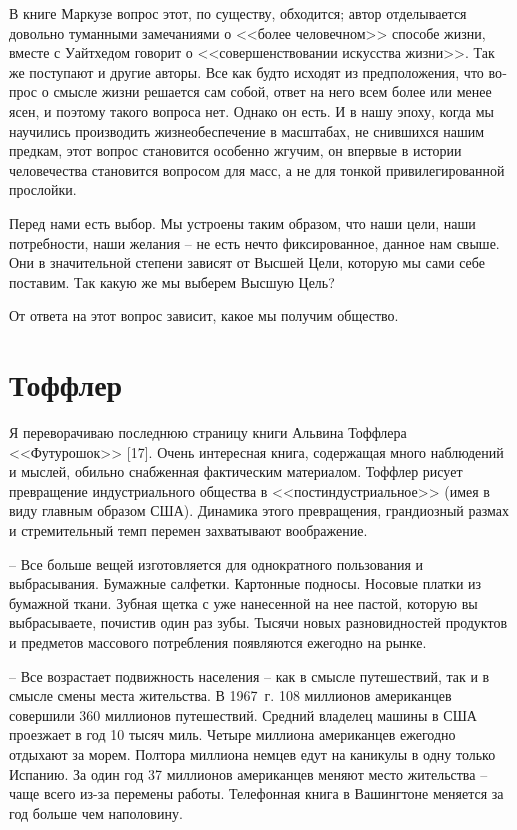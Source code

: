 \documentclass{book}
\begin{document}
В книге Маркузе вопрос этот, по существу, обходится; ав­тор отделывается довольно туманными замечаниями о <<более человечном>> способе жизни, вместе с Уайтхедом говорит о <<со­вершенствовании искусства жизни>>. Так же поступают и другие авторы. Все как будто исходят из предположения, что во­прос о смысле жизни решается сам собой, ответ на него всем более или менее ясен, и поэтому такого вопроса нет. Однако он есть. И в нашу эпоху, когда мы научились производить жизнеобеспечение в масштабах, не снившихся нашим предкам, этот вопрос становится особенно жгучим, он впервые в исто­рии человечества становится вопросом для масс,  а не для тонкой привилегированной прослойки.

Перед нами есть выбор. Мы устроены таким образом, что наши цели, наши потребности, наши желания -- не есть нечто фиксированное, данное нам свыше. Они в значительной степе­ни зависят от Высшей Цели, которую мы сами себе поставим. Так какую же мы выберем Высшую Цель?

От ответа на этот вопрос зависит, какое мы получим общество.


\section{Тоффлер}

Я переворачиваю последнюю страницу книги Альвина Тоффлера <<Футурошок>> [17]. Очень интересная книга, содержащая много наблюдений и мыслей, обильно снабженная фактическим материалом. Тоффлер рисует превращение индустриального общества в <<постиндустриальное>> (имея в виду главным образом США). Динамика этого превращения, грандиозный размах и стремительный темп перемен захватывают воображение.

-- Все больше вещей изготовляется для однократного пользования и выбрасывания. Бумажные салфетки. Картонные подносы. Носовые платки из бумажной ткани. Зубная щетка с уже нанесенной на нее пастой, которую вы выбрасываете, почистив один раз зубы. Тысячи новых разновидностей продуктов и предметов массового потребления появляются ежегодно на рынке.

-- Все возрастает подвижность населения -- как в смысле путешествий, так и в смысле смены места жительства. В 1967~г. 108 миллионов американцев совершили 360 миллионов путешествий. Средний владелец машины в США проезжает в год 10 тысяч миль. Четыре миллиона американцев ежегодно отдыхают за морем. Полтора миллиона немцев едут на каникулы в одну только Испанию. За один год 37 миллионов американцев меняют место жительства -- чаще всего из-за перемены работы. Телефонная книга в Вашингтоне меняется за год больше чем наполовину.
\end{document}
